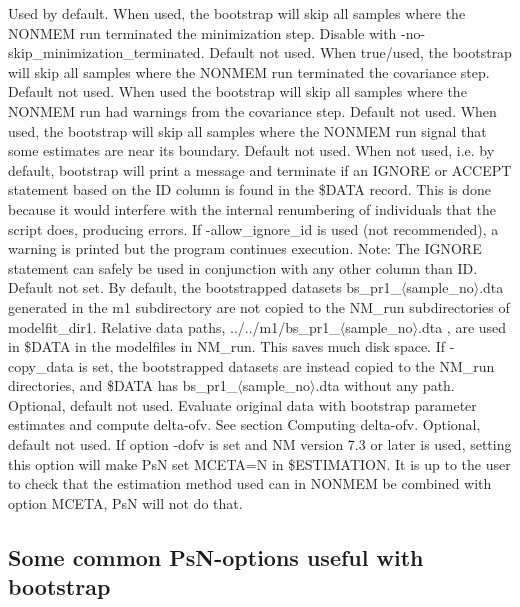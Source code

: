 \begin{optionlist}
\nextopt
{}
Used by default. When used, the bootstrap will skip all samples where the NONMEM run terminated the minimization step. Disable with -no-skip\_minimization\_terminated. 
\nextopt
{}
Default not used. When true/used, the bootstrap will skip all samples where the NONMEM run terminated the covariance step. 
\nextopt
{}
Default not used. When used the bootstrap will skip all samples where the NONMEM run had warnings from the covariance step. 
\nextopt
{}
Default not used. When used, the bootstrap will skip all samples where the NONMEM run signal that some estimates are near its boundary. 
\nextopt
{}
Default not used. When not used, i.e. by default, bootstrap will print a message and terminate if an IGNORE or ACCEPT statement based on the ID column is found in the \$DATA record. This is done because it would interfere with the internal renumbering of individuals that the script does, producing errors. If -allow\_ignore\_id is used (not recommended), a warning is printed but the program continues execution. Note: The IGNORE statement can safely be used in conjunction with any other column than ID. 
\nextopt
{}
Default not set. By default, the bootstrapped datasets bs\_pr1\_$\langle$sample\_no$\rangle$.dta generated in the m1 subdirectory are not copied to the NM\_run subdirectories of modelfit\_dir1. Relative data paths, ../../m1/bs\_pr1\_$\langle$sample\_no$\rangle$.dta , are used in \$DATA in the modelfiles in NM\_run. This saves much disk space. If -copy\_data is set, the bootstrapped datasets are instead copied to the NM\_run directories, and \$DATA has  bs\_pr1\_$\langle$sample\_no$\rangle$.dta without any path. 
\nextopt
{}
Optional, default not used. Evaluate original data with bootstrap parameter estimates and compute delta-ofv. See section Computing delta-ofv. 
\nextopt
{}
Optional, default not used. If option -dofv is set and NM version 7.3 or later is used, setting this option will make PsN set MCETA=N in \$ESTIMATION. It is up to the user to check that the estimation method used can in NONMEM be combined with option MCETA, PsN will not do that. 
\nextopt
\end{optionlist}


\subsection{Some common PsN-options useful with bootstrap}

